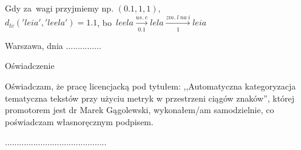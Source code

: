 \documentclass[12pt, twoside, openany]{report}
\theoremstyle{plain}
\begin{document}
Gdy za~wagi przyjmiemy np. $(0.1, 1, 1)$, \\
$d_{lv}('leia', 'leela') = 1.1$, bo~$leela  \xrightarrow[0.1]{us.\ e} lela  \xrightarrow[1]{zm.\ l\ na\ i} leia$ 





\clearpage
\pagestyle{empty}
\noindent Warszawa, dnia ...............
\vspace{5cm}
\begin{center}
\LARGE{Oświadczenie}
\end{center}
Oświadczam, że pracę licencjacką pod tytułem: ,,Automatyczna kategoryzacja tematyczna tekstów przy użyciu metryk w przestrzeni ciągów znaków'', której promotorem jest dr Marek Gągolewski, wykonałem/am samodzielnie, co poświadczam własnoręcznym podpisem.
\vspace{2cm}
\begin{flushright}
...........................................
\end{flushright}
\end{document}
